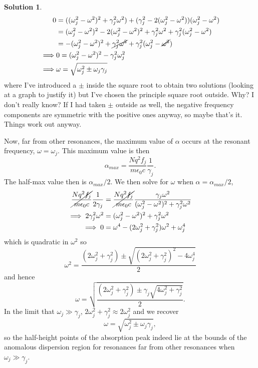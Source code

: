 \documentclass[10pt]{article}
\theoremstyle{definition}
\newtheorem{soln}{Solution}
\begin{document}
\begin{soln}
\begin{align*}
    0        & =((\omega_j^2-\omega^2)^2+\gamma_j^2\omega^2)
    +(\gamma_j^2-2(\omega_j^2-\omega^2))(\omega_j^2-\omega^2)                                                       \\
             & =(\omega_j^2-\omega^2)^2-2(\omega_j^2-\omega^2)^2+\gamma_j^2\omega^2+\gamma_j^2(\omega_j^2-\omega^2) \\
             & =-(\omega_j^2-\omega^2)^2+\cancel{\gamma_j^2\omega^2}+\gamma_j^2(\omega_j^2-\cancel{\omega^2})       \\
    \implies & 0=(\omega_j^2-\omega^2)^2-\gamma_j^2\omega_j^2                                                       \\
    \implies & \omega=\sqrt{\omega_j^2\pm\omega_j\gamma_j}
  \end{align*}
  where I've introduced a $\pm$ inside the square root to obtain two solutions (looking at a graph to justify it)
  but I've chosen the principle square root outside. Why? I don't really know? If I had taken $\pm$ outside as well,
  the negative frequency components are symmetric with the positive ones anyway, so maybe that's it. Things work out anyway.


  Now, far from  other resonances, the maximum value of $\alpha$ occurs at the resonant frequency, $\omega=\omega_j$. This maximum value is then
  $$\alpha_{max}=\frac{Nq^2f_j}{m\epsilon_0c}\frac{1}{\gamma_j}.$$
  The half-max value then is $\alpha_{max}/2$. We then solve for $\omega$ when $\alpha=\alpha_{max}/2$,
  \begin{align*}
    \cancel{\frac{Nq^2f_j}{m\epsilon_0c}}\frac{1}{2\gamma_j} & =\cancel{\frac{Nq^2f_j}{m\epsilon_0c}}\frac{\gamma_j\omega^2}{(\omega_j^2-\omega^2)^2+\gamma_j^2\omega^2} \\
    \implies 2\gamma_j^2\omega^2                             & =(\omega_j^2-\omega^2)^2+\gamma_j^2\omega^2                                                               \\
    \implies 0                                               & =\omega^4-(2\omega_j^2+\gamma_j^2)\omega^2+\omega_j^4                                                     \\
  \end{align*}
  which is quadratic in $\omega^2$ so
  $$\omega^2=\frac{(2\omega_j^2+\gamma_j^2)\pm\sqrt{(2\omega_j^2+\gamma_j^2)^2-4\omega_j^4}}{2}$$
  and hence
  $$\omega=\sqrt{\frac{(2\omega_j^2+\gamma_j^2)\pm\gamma_j\sqrt{4\omega_j^2+\gamma_j^2}}{2}}.$$
  In the limit that $\omega_j\gg \gamma_j$, $2\omega_j^2+\gamma_j^2\approx 2\omega_j^2$ and we recover
  $$\omega=\sqrt{\omega_j^2\pm\omega_j\gamma_j},$$
  so the half-height points of the absorption peak indeed lie at the bounds of the anomalous dispersion region for
  resonances far from other resonances when $\omega_j\gg\gamma_j$.
\end{soln}
\newpage
\end{document}
